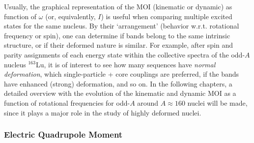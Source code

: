 Usually, the graphical representation of the MOI (kinematic or dynamic) as function of $\omega$ (or, equivalently, $I$) is useful when comparing multiple excited states for the same nucleus. By their `arrangement' (behavior w.r.t. rotational frequency or spin), one can determine if bands belong to the same intrinsic structure, or if their deformed nature is similar. For example, after spin and parity assignments of each energy state within the collective spectra of the odd-$A$ nucleus $^{163}$Lu, it is of interest to see how many sequences have \emph{normal deformation}, which single-particle + core couplings are preferred, if the bands have enhanced (strong) deformation, and so on. In the following chapters, a detailed overview with the evolution of the kinematic and dynamic MOI as a function of rotational frequencies for odd-$A$ around $A\approx 160$ nuclei will be made, since it plays a major role in the study of highly deformed nuclei. %

\subsubsection*{Electric Quadrupole Moment}

